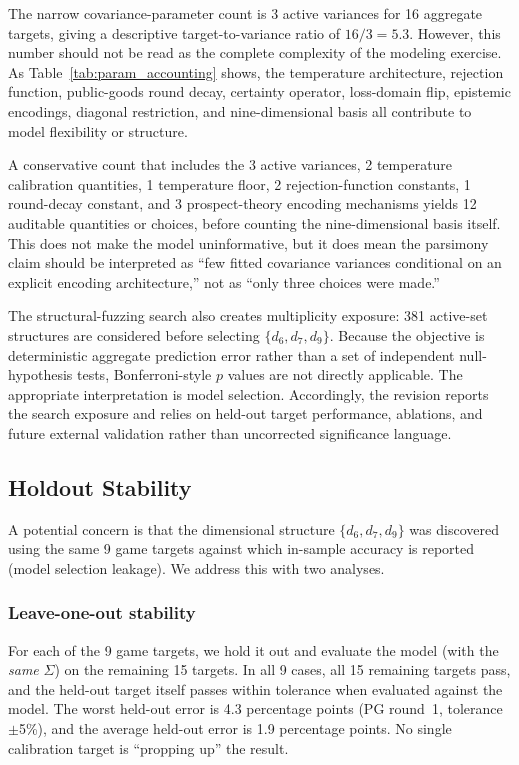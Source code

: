 \documentclass[journal]{IEEEtran}
\begin{document}
The narrow covariance-parameter count is 3 active variances for 16 aggregate targets, giving a descriptive target-to-variance ratio of $16/3=5.3$.
However, this number should not be read as the complete complexity of the modeling exercise.
As Table~\ref{tab:param_accounting} shows, the temperature architecture, rejection function, public-goods round decay, certainty operator, loss-domain flip, epistemic encodings, diagonal restriction, and nine-dimensional basis all contribute to model flexibility or structure.

A conservative count that includes the 3 active variances, 2 temperature calibration quantities, 1 temperature floor, 2 rejection-function constants, 1 round-decay constant, and 3 prospect-theory encoding mechanisms yields 12 auditable quantities or choices, before counting the nine-dimensional basis itself.
This does not make the model uninformative, but it does mean the parsimony claim should be interpreted as ``few fitted covariance variances conditional on an explicit encoding architecture,'' not as ``only three choices were made.''

The structural-fuzzing search also creates multiplicity exposure: 381 active-set structures are considered before selecting $\{d_6,d_7,d_9\}$.
Because the objective is deterministic aggregate prediction error rather than a set of independent null-hypothesis tests, Bonferroni-style $p$ values are not directly applicable.
The appropriate interpretation is model selection.
Accordingly, the revision reports the search exposure and relies on held-out target performance, ablations, and future external validation rather than uncorrected significance language.

\subsection{Holdout Stability}

A potential concern is that the dimensional structure $\{d_6, d_7, d_9\}$ was discovered using the same 9 game targets against which in-sample accuracy is reported (model selection leakage).
We address this with two analyses.

\subsubsection{Leave-one-out stability}
For each of the 9 game targets, we hold it out and evaluate the model (with the \emph{same} $\Sigma$) on the remaining 15 targets.
In all 9 cases, all 15 remaining targets pass, and the held-out target itself passes within tolerance when evaluated against the model.
The worst held-out error is 4.3 percentage points (PG round~1, tolerance $\pm$5\%), and the average held-out error is 1.9 percentage points.
No single calibration target is ``propping up'' the result.
\end{document}

